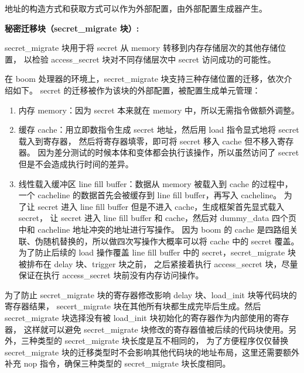 地址的构造方式和获取方式可以作为外部配置，由外部配置生成器产生。\par

\textbf{秘密迁移块（secret\_migrate 块）:}\par
secret\_migrate 块用于将 secret 从 memory 转移到内存存储层次的其他存储位置，
以检验 access\_secret 块对不同存储层次中 secret 访问成功的可能性。\par

在 boom 处理器的环境上，secret\_migrate 块支持三种存储位置的迁移，依次介绍如下。
secret 的迁移被作为该块的外部配置，被配置生成单元管理：
\begin{enumerate}
    \item 内存 memory：因为 secret 本来就在 memory 中，所以无需指令做额外调整。\par
    \item 缓存 cache：用立即数指令生成 secret 地址，然后用 load 指令显式地将 secret 载入到寄存器，
然后将寄存器填零，即可将 secret 移入 cache 但不移入寄存器。
因为差分测试的时候本体和变体都会执行该操作，所以虽然访问了 secret 但是不会造成执行时间的差异。\par
    \item 线性载入缓冲区 line fill buffer：数据从 memory 被载入到 cache 的过程中，
    一个 cacheline 的数据首先会被缓存到 line fill buffer，再写入 cacheline。
    为了让 secret 进入 line fill buffer 但是不进入 cache，生成框架首先显式载入 secret，
    让 secret 进入 line fill buffer 和 cache，然后对 dummy\_data 四个页中和 cacheline 地址冲突的地址进行写操作。
    因为 boom 的 cache 是四路组关联、伪随机替换的，所以做四次写操作大概率可以将 cache 中的 secret 覆盖。
    为了防止后续的 load 操作覆盖 line fill buffer 中的 secret，secret\_migrate 块被排布在 delay 块、trigger 块之前，
    之后紧接着执行 access\_secret 块，尽量保证在执行 access\_secret 块前没有内存访问操作。\par
\end{enumerate}

为了防止 secret\_migrate 块的寄存器修改影响 delay 块、load\_init 块等代码块的寄存器结果，
secert\_migrate 块在其他所有块都生成完毕后生成。然后 secret\_migrate 块选择没有被 load\_init 块初始化的寄存器作为内部使用的寄存器，
这样就可以避免 secret\_migrate 块修改的寄存器值被后续的代码块使用。另外，三种类型的 secret\_migrate 块长度是互不相同的，
为了方便程序仅仅替换 secret\_migrate 块的迁移类型时不会影响其他代码块的地址布局，这里还需要额外补充 nop 指令，确保三种类型的 secret\_migrate 块长度相同。\par

